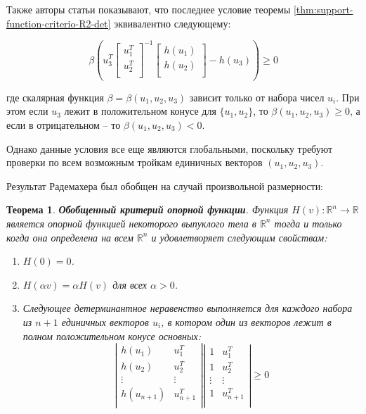 \documentclass[a4paper, 12pt, titlepage]{article}
\theoremstyle{definition}
\theoremstyle{plain}
\newtheorem{SmartTheorem}{Теорема}
\begin{document}
Также авторы статьи показывают, что последнее условие теоремы
\ref{thm:support-function-criterio-R2-det} эквивалентно следующему:

\begin{equation}
 \beta \left( u_{3}^{T}
 \left[
 \begin{array}{c}
 u_{1}^{T} \\
 u_{2}^{T} \\
 \end{array}
 \right]^{-1}
 \left[
 \begin{array}{c}
 h(u_{1}) \\
 h(u_{2}) \\
 \end{array}
 \right] - h(u_{3}) \right) \geq 0
\end{equation}

где скалярная функция $\beta = \beta(u_{1}, u_{2}, u_{3})$ зависит только от
набора чисел $u_{i}$. При этом если $u_{3}$ лежит в положительном конусе для
$\{u_{1}, u_{2}\}$, то $\beta(u_{1}, u_{2}, u_{3}) \geq 0$, а если в
отрицательном -- то $\beta(u_{1}, u_{2}, u_{3}) < 0$.

Однако данные условия все еще являются глобальными, поскольку требуют проверки
по всем возможным тройкам единичных векторов $(u_{1}, u_{2}, u_{3})$.

Результат Радемахера был обобщен на случай произвольной размерности:

\begin{SmartTheorem}
 \label{thm:support-function-criterio-ext}
 \textbf{Обобщенный критерий опорной функции}.
 Функция $H(v): \mathbb{R}^{n} \to \mathbb{R}$ является опорной функцией
 некоторого выпуклого тела в $\mathbb{R}^{n}$ тогда и только когда она
 определена на всем $\mathbb{R}^{n}$ и удовлетворяет следующим свойствам:
 \begin{enumerate}
  \item $H(0) = 0$.
  \item $H(\alpha v) = \alpha H(v)$ для всех $\alpha > 0$.
  \item Следующее детерминантное неравенство выполняется для каждого набора из
  $n + 1$ единичных векторов $u_{i}$, в котором один из векторов лежит в полном
  положительном конусе основных:
\begin{equation}
 \left|\begin{array}{cc}
  h(u_{1}) & u_{1}^{T} \\
  h(u_{2}) & u_{2}^{T} \\
  \vdots & \vdots \\
  h(u_{n + 1}) & u_{n + 1}^{T} \\
 \end{array}\right|
  \left|\begin{array}{cc}
  1 & u_{1}^{T} \\
  1 & u_{2}^{T} \\
  \vdots & \vdots \\
  1 & u_{n + 1}^{T} \\
 \end{array}\right|
 \geq 0
\end{equation}

 \end{enumerate}
\end{SmartTheorem}
\end{document}
